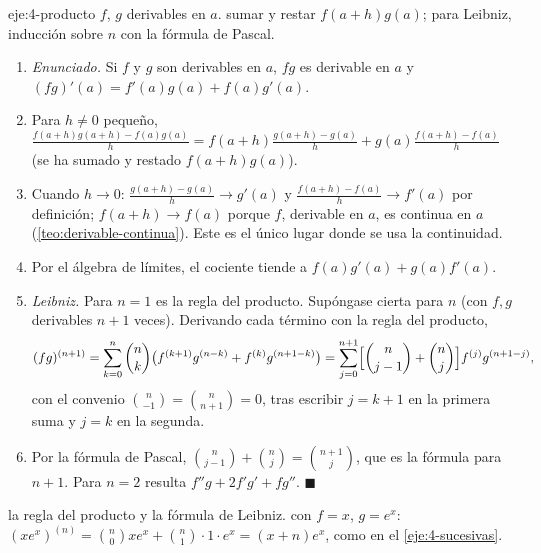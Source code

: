 \begin{solucion}{eje:4-producto}
\datos $f$, $g$ derivables en $a$.
\planteamiento sumar y restar $f(a+h)g(a)$; para Leibniz, inducción sobre $n$ con la fórmula de Pascal.
\pasos
\begin{enumerate}[label=\arabic*.]
  \item \emph{Enunciado.} Si $f$ y $g$ son derivables en $a$, $fg$ es derivable en $a$ y $(fg)'(a)=f'(a)g(a)+f(a)g'(a)$.
  \item Para $h\ne0$ pequeño, $\frac{f(a+h)g(a+h)-f(a)g(a)}{h}=f(a+h)\frac{g(a+h)-g(a)}{h}+g(a)\frac{f(a+h)-f(a)}{h}$ (se ha sumado y restado $f(a+h)g(a)$).
  \item Cuando $h\to0$: $\frac{g(a+h)-g(a)}{h}\to g'(a)$ y $\frac{f(a+h)-f(a)}{h}\to f'(a)$ por definición; $f(a+h)\to f(a)$ porque $f$, derivable en $a$, es continua en $a$ (\cref{teo:derivable-continua}). Este es el único lugar donde se usa la continuidad.
  \item Por el álgebra de límites, el cociente tiende a $f(a)g'(a)+g(a)f'(a)$.
  \item \emph{Leibniz.} Para $n=1$ es la regla del producto. Supóngase cierta para $n$ (con $f,g$ derivables $n+1$ veces). Derivando cada término con la regla del producto,
  \[
  (fg)^{(n+1)}=\sum_{k=0}^{n}\binom nk\bigl(f^{(k+1)}g^{(n-k)}+f^{(k)}g^{(n+1-k)}\bigr)=\sum_{j=0}^{n+1}\Bigl[\binom n{j-1}+\binom nj\Bigr]f^{(j)}g^{(n+1-j)},
  \]
  con el convenio $\binom n{-1}=\binom n{n+1}=0$, tras escribir $j=k+1$ en la primera suma y $j=k$ en la segunda.
  \item Por la fórmula de Pascal, $\binom n{j-1}+\binom nj=\binom{n+1}{j}$, que es la fórmula para $n+1$. Para $n=2$ resulta $f''g+2f'g'+fg''$. \hfill$\blacksquare$
\end{enumerate}
\resultado la regla del producto y la fórmula de Leibniz.
\comprobacion con $f=x$, $g=e^{x}$: $(xe^{x})^{(n)}=\binom n0xe^{x}+\binom n1\cdot1\cdot e^{x}=(x+n)e^{x}$, como en el \cref{eje:4-sucesivas}.
\end{solucion}

